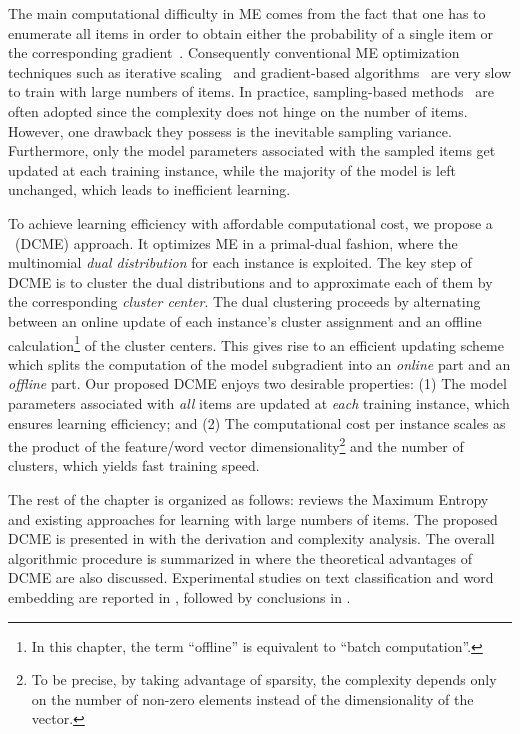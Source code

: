 The main computational difficulty in ME comes from the fact that one has to
enumerate all items in order to obtain either the probability of a single item
or the corresponding gradient~\cite{mnih2012fast}. Consequently conventional ME
optimization techniques such as iterative
scaling~\cite{berger1996maximum,darroch1972generalized} and gradient-based
algorithms~\cite{tsuruoka2009stochastic,gao2007comparative} are very slow to
train with large numbers of items. In practice, sampling-based
methods~\cite{gutmann2010noise,mnih2012fast,bengio2008adaptive} are often
adopted since the complexity does not hinge on the number of items. However, one
drawback they possess is the inevitable sampling variance. Furthermore, only the
model parameters associated with the sampled items get updated at each training
instance, while the majority of the model is left unchanged, which leads to
inefficient learning.

To achieve learning efficiency with affordable computational cost, we propose a
\DCME{}~(DCME) approach. It optimizes ME in a primal-dual fashion, where the
multinomial \emph{dual distribution} for each instance is exploited. The key
step of DCME is to cluster the dual distributions and to approximate each of
them by the corresponding \emph{cluster center}. The dual clustering proceeds by
alternating between an online update of each instance's cluster assignment and
an offline calculation\footnote{In this chapter, the term ``offline'' is
equivalent to ``batch computation''. } of the cluster centers. This gives rise
to an efficient updating scheme which splits the computation of the model
subgradient into an \emph{online} part and an \emph{offline} part. Our proposed
DCME enjoys two desirable properties: (1) The model parameters associated with
\emph{all} items are updated at \emph{each} training instance, which ensures
learning efficiency; and (2) The computational cost per instance scales as the
product of the feature/word vector dimensionality\footnote{To be precise, by
taking advantage of sparsity, the complexity depends only on the number of
non-zero elements instead of the dimensionality of the vector.} and the number
of clusters, which yields fast training speed.

The rest of the chapter is organized as follows:  reviews
the Maximum Entropy and existing approaches for learning with large numbers of
items. The proposed DCME is presented in  with the
derivation and complexity analysis. The overall algorithmic procedure is
summarized in  where the theoretical advantages of DCME are
also discussed. Experimental studies on text classification and word embedding
are reported in , followed by conclusions in
.
